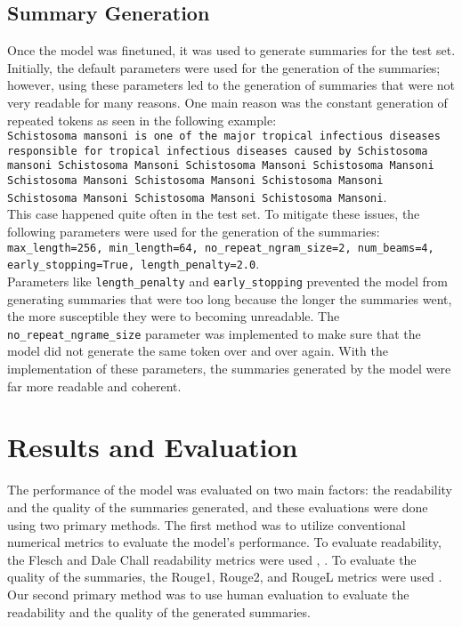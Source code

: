 \documentclass[11pt,a4paper]{article}
\begin{document}
\subsection{Summary Generation}
\indent \indent Once the model was finetuned, it was used to generate summaries for the test set. Initially, the default parameters were used for the generation of the summaries; however, using these parameters led to the generation of summaries that were not very readable for many reasons. One main reason was the constant generation of repeated tokens as seen in the following example: \\
\texttt{Schistosoma mansoni is one of the major tropical infectious diseases responsible for tropical infectious diseases caused by Schistosoma mansoni Schistosoma Mansoni Schistosoma Mansoni Schistosoma Mansoni Schistosoma Mansoni Schistosoma Mansoni Schistosoma Mansoni Schistosoma Mansoni Schistosoma Mansoni Schistosoma Mansoni}. \\
This case happened quite often in the test set. To mitigate these issues, the following parameters were used for the generation of the summaries: \\
\texttt{max\_length=256, min\_length=64, no\_repeat\_ngram\_size=2, num\_beams=4, early\_stopping=True, length\_penalty=2.0}. \\
Parameters like \texttt{length\_penalty} and \texttt{early\_stopping} prevented the model from generating summaries that were too long because the longer the summaries went, the more susceptible they were to becoming unreadable. The \texttt{no\_repeat\_ngrame\_size} parameter was implemented to make sure that the model did not generate the same token over and over again. With the implementation of these parameters, the summaries generated by the model were far more readable and coherent.


\section{Results and Evaluation}


\indent \indent The performance of the model was evaluated on two main factors: the readability and the quality of the summaries generated, and these evaluations were done using two primary methods. The first method was to utilize conventional numerical metrics to evaluate the model's performance. To evaluate readability, the Flesch and Dale Chall readability metrics were used \cite{Flesch1948}, \cite{chall1995readability}. To evaluate the quality of the summaries, the Rouge1, Rouge2, and RougeL metrics were used \cite{lin-2004-rouge}. Our second primary method was to use human evaluation to evaluate the readability and the quality of the generated summaries.
\end{document}
